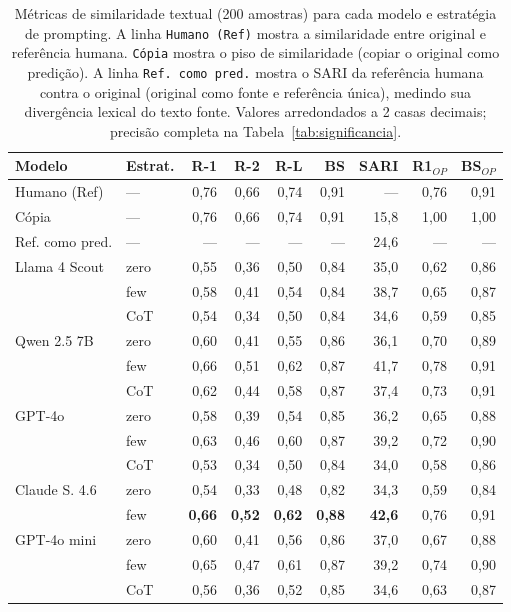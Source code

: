 \documentclass[a4paper, twocolumn, 11pt, twoside]{article}
\begin{document}
\begin{table}[htbp]
\centering
\caption{Métricas de similaridade textual (200 amostras) para cada
          modelo e estratégia de prompting. A linha {\tt Humano (Ref)}
          mostra a similaridade entre original e referência humana.
          {\tt Cópia} mostra o piso de similaridade (copiar o original
           como predição). A linha {\tt Ref.\ como pred.} mostra o
            SARI da referência humana contra o original (original como
             fonte e referência única), medindo sua divergência lexical
             do texto fonte. Valores arredondados a 2 casas decimais;
             precisão completa na Tabela~\ref{tab:significancia}.}
\label{tab:similaridade}
\footnotesize
\setlength{\tabcolsep}{3pt}
\begin{tabular}{l l r r r r r r r}
\toprule
Modelo & Estrat. & R-1 & R-2 & R-L & BS & SARI & R1$_{OP}$ & BS$_{OP}$\\
\midrule
Humano (Ref) & --- & 0,76 & 0,66 & 0,74 & 0,91 & ---   & 0,76 & 0,91 \\
Cópia        & --- & 0,76 & 0,66 & 0,74 & 0,91 & 15,8  & 1,00 & 1,00 \\
Ref. como pred. & --- & --- & --- & --- & --- & 24,6 & --- & --- \\
\midrule
Llama 4 Scout & zero & 0,55 & 0,36 & 0,50 & 0,84 & 35,0 & 0,62 & 0,86 \\
               & few  & 0,58 & 0,41 & 0,54 & 0,84 & 38,7 & 0,65 & 0,87 \\
               & CoT  & 0,54 & 0,34 & 0,50 & 0,84 & 34,6 & 0,59 & 0,85 \\
\midrule
Qwen 2.5 7B   & zero & 0,60 & 0,41 & 0,55 & 0,86 & 36,1 & 0,70 & 0,89 \\
               & few  & 0,66 & 0,51 & 0,62 & 0,87 & 41,7 & 0,78 & 0,91 \\
               & CoT  & 0,62 & 0,44 & 0,58 & 0,87 & 37,4 & 0,73 & 0,91 \\
\midrule
GPT-4o         & zero & 0,58 & 0,39 & 0,54 & 0,85 & 36,2 & 0,65 & 0,88 \\
                & few  & 0,63 & 0,46 & 0,60 & 0,87 & 39,2 & 0,72 & 0,90 \\
                & CoT  & 0,53 & 0,34 & 0,50 & 0,84 & 34,0 & 0,58 & 0,86 \\
\midrule
Claude S. 4.6  & zero & 0,54 & 0,33 & 0,48 & 0,82 & 34,3 & 0,59 & 0,84 \\
                & few  & \textbf{0,66} & \textbf{0,52} & \textbf{0,62} & \textbf{0,88} & \textbf{42,6} & 0,76 & 0,91 \\
\midrule
GPT-4o mini    & zero & 0,60 & 0,41 & 0,56 & 0,86 & 37,0 & 0,67 & 0,88 \\
                & few  & 0,65 & 0,47 & 0,61 & 0,87 & 39,2 & 0,74 & 0,90 \\
                & CoT  & 0,56 & 0,36 & 0,52 & 0,85 & 34,6 & 0,63 & 0,87 \\
\bottomrule
\end{tabular}
\end{table}
\end{document}
